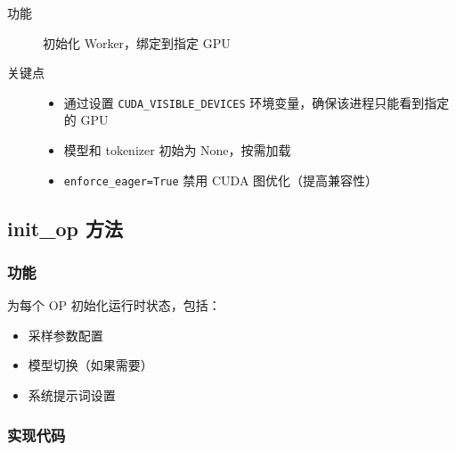 \documentclass[12pt,a4paper]{article}
\begin{document}
\begin{description}
    \item[功能] 初始化 Worker，绑定到指定 GPU
    \item[关键点]
    \begin{itemize}
        \item 通过设置 \texttt{CUDA\_VISIBLE\_DEVICES} 环境变量，确保该进程只能看到指定的 GPU
        \item 模型和 tokenizer 初始为 None，按需加载
        \item \texttt{enforce_eager=True} 禁用 CUDA 图优化（提高兼容性）
    \end{itemize}
\end{description}

\subsection{init\_op 方法}

\subsubsection{功能}

为每个 OP 初始化运行时状态，包括：
\begin{itemize}
    \item 采样参数配置
    \item 模型切换（如果需要）
    \item 系统提示词设置
\end{itemize}

\subsubsection{实现代码}
\end{document}
